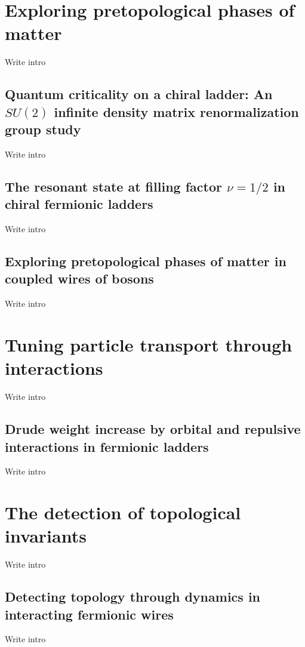 
\chapter{Exploring pretopological phases of matter}
\label{ch:Exploring_pretopological_phases_of_matter}
Write intro
\section{Quantum criticality on a chiral ladder: An $SU(2)$ infinite density matrix renormalization group study}
Write intro

\section{The resonant state at filling factor $\nu=1/2$ in chiral fermionic ladders}
Write intro

\section{Exploring pretopological phases of matter in coupled wires of bosons}
Write intro


\chapter{Tuning particle transport through interactions}
\label{ch:Tuning_particle_transport_through_interactions}
Write intro
\section{Drude weight increase by orbital and repulsive interactions in fermionic ladders}
Write intro



\chapter{The detection of topological invariants}
\label{ch:The_detection_of_topological_invariants}
Write intro
\section{Detecting topology through dynamics in interacting fermionic wires}
Write intro

